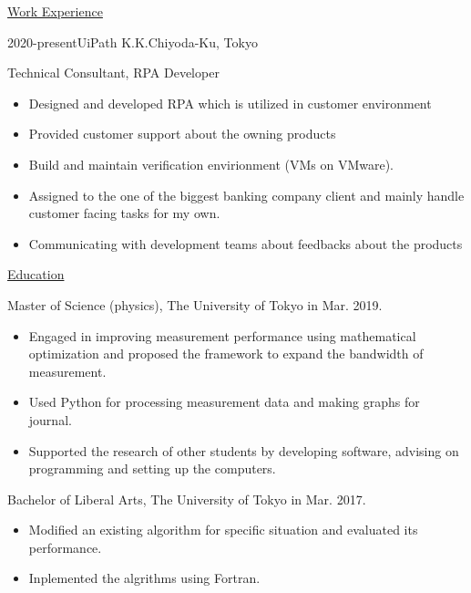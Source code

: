 \documentclass[a4paper,12pt]{ltjsarticle}
\begin{document}
\Large\noindent
\uline{\textsf{Work Experience}\hspace{\fill}}
\normalsize\par\noindent\vspace{-12pt}\par\noindent
\large\noindent
\textsf{2020-present\hspace{1cm}UiPath K.K.\hspace{1cm}Chiyoda-Ku, Tokyo}
\normalsize\par
Technical Consultant, RPA Developer
\begin{itemize}
    \item Designed and developed RPA which is utilized in customer environment
    \item Provided customer support about the owning products
    \item Build and maintain verification envirionment (VMs on VMware).
    \item Assigned to the one of the biggest banking company client and mainly handle customer facing tasks for my own.
    \item Communicating with development teams about feedbacks about the products
\end{itemize}

\Large\noindent
\uline{\textsf{Education}\hspace{\fill}}
\normalsize\par\noindent\vspace{-12pt}\par\noindent
\large\noindent
\textsf{Master of Science (physics), The University of Tokyo in Mar. 2019.}
\normalsize
\begin{itemize}
    \item Engaged in improving measurement performance using mathematical optimization and proposed the framework to expand the bandwidth of measurement.
    \item Used Python for processing measurement data and making graphs for journal.
    \item Supported the research of other students by developing software, advising on programming and setting up the computers.
\end{itemize}
\large\noindent
\textsf{Bachelor of Liberal Arts, The University of Tokyo in Mar. 2017.}
\normalsize
\begin{itemize}
    \item Modified an existing algorithm for specific situation and evaluated its performance.
    \item Inplemented the algrithms using Fortran.
\end{itemize}
\end{document}
